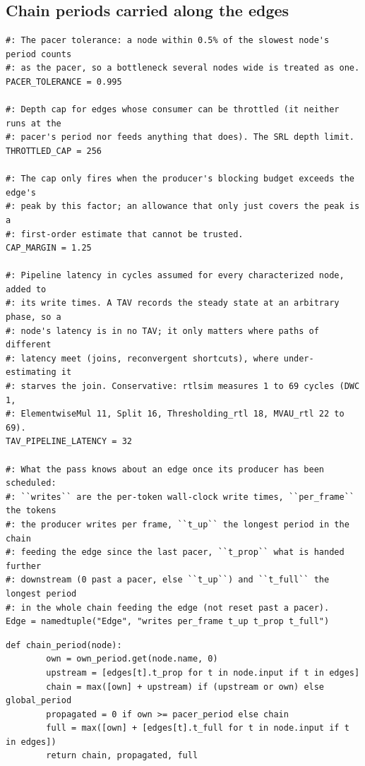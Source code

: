 \documentclass[10pt,a4paper]{article}
\begin{document}
\subsection{Chain periods carried along the edges}\label{sec:chain}

\begin{lstlisting}[firstnumber=574,title={\texttt{src/finn/transformation/fpgadataflow/derive\_characteristic.py}, lines 574--601}]
#: The pacer tolerance: a node within 0.5% of the slowest node's period counts
#: as the pacer, so a bottleneck several nodes wide is treated as one.
PACER_TOLERANCE = 0.995

#: Depth cap for edges whose consumer can be throttled (it neither runs at the
#: pacer's period nor feeds anything that does). The SRL depth limit.
THROTTLED_CAP = 256

#: The cap only fires when the producer's blocking budget exceeds the edge's
#: peak by this factor; an allowance that only just covers the peak is a
#: first-order estimate that cannot be trusted.
CAP_MARGIN = 1.25

#: Pipeline latency in cycles assumed for every characterized node, added to
#: its write times. A TAV records the steady state at an arbitrary phase, so a
#: node's latency is in no TAV; it only matters where paths of different
#: latency meet (joins, reconvergent shortcuts), where under-estimating it
#: starves the join. Conservative: rtlsim measures 1 to 69 cycles (DWC 1,
#: ElementwiseMul 11, Split 16, Thresholding_rtl 18, MVAU_rtl 22 to 69).
TAV_PIPELINE_LATENCY = 32

#: What the pass knows about an edge once its producer has been scheduled:
#: ``writes`` are the per-token wall-clock write times, ``per_frame`` the tokens
#: the producer writes per frame, ``t_up`` the longest period in the chain
#: feeding the edge since the last pacer, ``t_prop`` what is handed further
#: downstream (0 past a pacer, else ``t_up``) and ``t_full`` the longest period
#: in the whole chain feeding the edge (not reset past a pacer).
Edge = namedtuple("Edge", "writes per_frame t_up t_prop t_full")
\end{lstlisting}
\begin{lstlisting}[firstnumber=886,title={\texttt{src/finn/transformation/fpgadataflow/derive\_characteristic.py}, lines 886--892}]
    def chain_period(node):
        own = own_period.get(node.name, 0)
        upstream = [edges[t].t_prop for t in node.input if t in edges]
        chain = max([own] + upstream) if (upstream or own) else global_period
        propagated = 0 if own >= pacer_period else chain
        full = max([own] + [edges[t].t_full for t in node.input if t in edges])
        return chain, propagated, full
\end{lstlisting}
\end{document}
